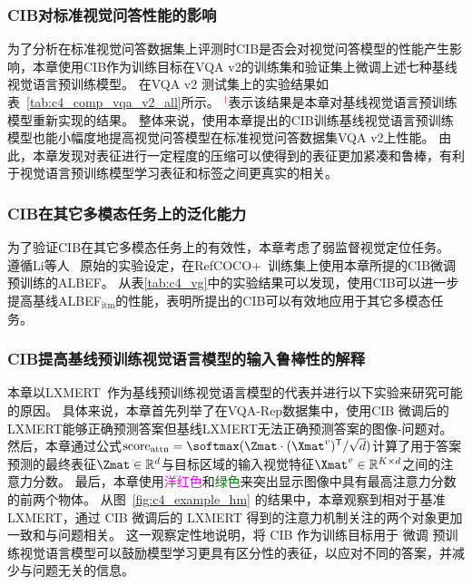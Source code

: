 


\subsubsection{CIB对标准视觉问答性能的影响}

为了分析在标准视觉问答数据集上评测时CIB是否会对视觉问答模型的性能产生影响，本章使用CIB作为训练目标在VQA v2的训练集和验证集上微调上述七种基线视觉语言预训练模型。
在VQA v2 测试集上的实验结果如表~\ref{tab:c4_comp_vqa_v2_all}所示。
\textcolor{red}{$^{\dagger}$}表示该结果是本章对基线视觉语言预训练模型重新实现的结果。
整体来说，使用本章提出的CIB训练基线视觉语言预训练模型也能小幅度地提高视觉问答模型在标准视觉问答数据集VQA v2上性能。
由此，本章发现对表征进行一定程度的压缩可以使得到的表征更加紧凑和鲁棒，有利于视觉语言预训练模型学习表征和标签之间更真实的相关。



\subsubsection{CIB在其它多模态任务上的泛化能力}
为了验证CIB在其它多模态任务上的有效性，本章考虑了弱监督视觉定位任务。
遵循Li等人~\cite{li2021align} 原始的实验设定，在RefCOCO+~\cite{yu2016modeling}训练集上使用本章所提的CIB微调预训练的ALBEF。
从表\ref{tab:c4_vg}中的实验结果可以发现，使用CIB可以进一步提高基线ALBEF$_{\text{itm}}$的性能，表明所提出的CIB可以有效地应用于其它多模态任务。







\subsubsection{CIB提高基线预训练视觉语言模型的输入鲁棒性的解释}

本章以LXMERT~\cite{tan2019lxmert}作为基线预训练视觉语言模型的代表并进行以下实验来研究可能的原因。
具体来说，本章首先列举了在VQA-Rep数据集中，使用CIB 微调后的LXMERT能够正确预测答案但基线LXMERT无法正确预测答案的图像-问题对。
然后，本章通过公式$\text{score}_\text{attn} = \softmax(\Zmat \cdot (\Xmat^{v})^{\mathsf{T}}/\sqrt{d})$计算了用于答案预测的最终表征$\Zmat \in \mathbb{R}^d$与目标区域的输入视觉特征$\Xmat^v \in \mathbb{R}^{K\times d}$之间的注意力分数。
最后，本章使用\textcolor{magenta}{洋红色}和\textcolor{green}{绿色}来突出显示图像中具有最高注意力分数的前两个物体。
从图~\ref{fig:c4_example_hm} 的结果中，本章观察到相对于基准 LXMERT，通过 CIB 微调后的 LXMERT 得到的注意力机制关注的两个对象更加一致和与问题相关。
这一观察定性地说明，将 CIB 作为训练目标用于 微调 预训练视觉语言模型可以鼓励模型学习更具有区分性的表征，以应对不同的答案，并减少与问题无关的信息。


